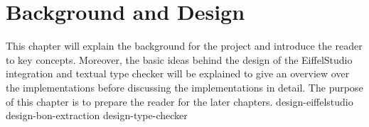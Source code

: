 \chapter{Background and Design}
This chapter will explain the background for the project and introduce the reader to key concepts. Moreover, the basic ideas behind the design of the EiffelStudio integration and textual \bon{} type checker will be explained to give an overview over the implementations before discussing the implementations in detail. The purpose of this chapter is to prepare the reader for the later chapters.
{design-eiffelstudio}
{design-bon-extraction}
{design-type-checker}